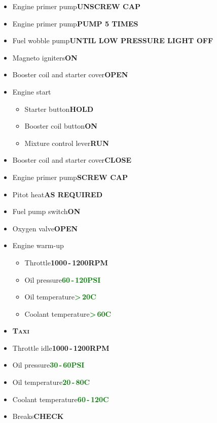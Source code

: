 \documentclass[a4paper,12pt,dvipsnames]{letter}
\newcommand{\button}[1]{\textbf{#1}}
\newcommand{\degC}{\textdegree{}C}
\newcommand{\ok}[1]{\textcolor{Green}{\textbf{#1}}}
\newcommand{\myHead}[1]{{\LARGE\textsc{\textbf{#1}}}}
\begin{document}
{\begin{itemize}
 \item Engine primer pump\dotfill\button{UNSCREW CAP}
 \item Engine primer pump\dotfill\button{PUMP 5 TIMES}
 \item Fuel wobble pump\dotfill\button{UNTIL LOW PRESSURE LIGHT OFF}
 \item Magneto igniters\dotfill\button{ON}
 \item Booster coil and starter cover\dotfill\button{OPEN}
 \item Engine start
 \begin{itemize}
  \item Starter button\dotfill\button{HOLD}
  \item Booster coil button\dotfill\button{ON}
  \item Mixture control lever\dotfill\button{RUN}
 \end{itemize}
 \item Booster coil and starter cover\dotfill\button{CLOSE}
 \item Engine primer pump\dotfill\button{SCREW CAP}
 \item Pitot heat\dotfill\button{AS REQUIRED}
 \item Fuel pump switch\dotfill\button{ON}
 \item Oxygen valve\dotfill\button{OPEN}
 \item Engine warm-up
 \begin{itemize}
  \item Throttle\dotfill\button{1000\,-\,1200\;RPM}
  \item Oil pressure\dotfill\ok{60\,-\,120\;PSI}
  \item Oil temperature\dotfill\ok{>\,20\degC}
  \item Coolant temperature\dotfill\ok{>\,60\degC}
 \end{itemize}
\end{itemize}
\newpage
\begin{itemize}
 \item[] \myHead{Taxi}
 \item Throttle idle\dotfill\button{1000\,-\,1200\;RPM}
 \item Oil pressure\dotfill\ok{30\,-\,60\;PSI}
 \item Oil temperature\dotfill\ok{20\,-\,80\degC}
 \item Coolant temperature\dotfill\ok{60\,-\,120\degC}
 \item Breaks\dotfill\button{CHECK}

\end{itemize}}
\end{document}
